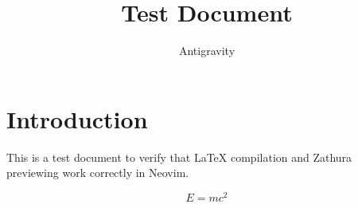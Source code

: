 \documentclass{article}
\title{Test Document}
\author{Antigravity}
\begin{document}
\maketitle

\section{Introduction}
This is a test document to verify that \LaTeX{} compilation and Zathura previewing work correctly in Neovim.

\begin{equation}
    E = mc^2
\end{equation}
\end{document}
